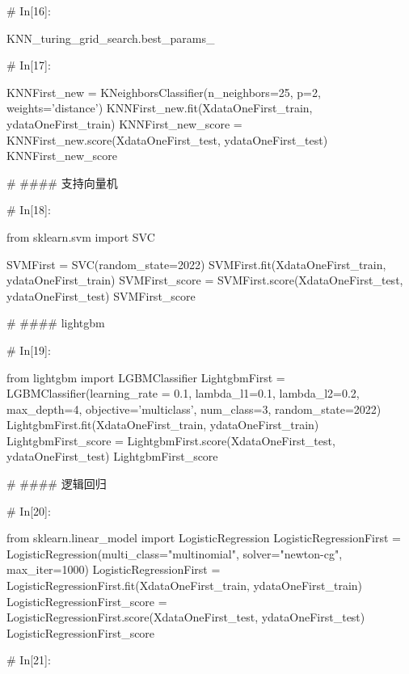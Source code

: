 \documentclass{MathorCupmodeling}
\begin{document}
\begin{python}
# In[16]:


KNN_turing_grid_search.best_params_


# In[17]:


KNNFirst_new = KNeighborsClassifier(n_neighbors=25, p=2, weights='distance')
KNNFirst_new.fit(XdataOneFirst_train, ydataOneFirst_train)
KNNFirst_new_score = KNNFirst_new.score(XdataOneFirst_test, ydataOneFirst_test)
KNNFirst_new_score


# #### 支持向量机

# In[18]:


from sklearn.svm import SVC

SVMFirst = SVC(random_state=2022)
SVMFirst.fit(XdataOneFirst_train, ydataOneFirst_train)
SVMFirst_score = SVMFirst.score(XdataOneFirst_test, ydataOneFirst_test)
SVMFirst_score


# #### lightgbm

# In[19]:


from lightgbm import LGBMClassifier
LightgbmFirst = LGBMClassifier(learning_rate = 0.1,
                               lambda_l1=0.1,
                               lambda_l2=0.2,
                               max_depth=4,
                               objective='multiclass',
                               num_class=3,
                               random_state=2022)
LightgbmFirst.fit(XdataOneFirst_train, ydataOneFirst_train)
LightgbmFirst_score = LightgbmFirst.score(XdataOneFirst_test, ydataOneFirst_test)
LightgbmFirst_score


# #### 逻辑回归

# In[20]:


from sklearn.linear_model import LogisticRegression
LogisticRegressionFirst = LogisticRegression(multi_class="multinomial", solver="newton-cg", max_iter=1000)
LogisticRegressionFirst = LogisticRegressionFirst.fit(XdataOneFirst_train, ydataOneFirst_train)
LogisticRegressionFirst_score = LogisticRegressionFirst.score(XdataOneFirst_test, ydataOneFirst_test)
LogisticRegressionFirst_score


# In[21]:



\end{python}
\end{document}

